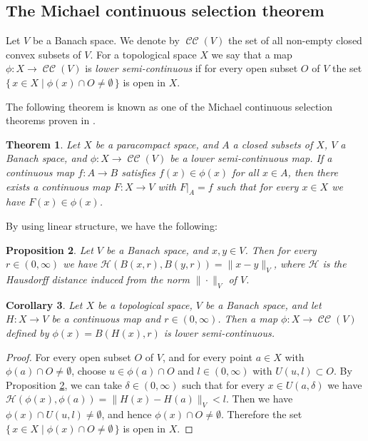 \documentclass[a4paper, 12pt]{amsart}
\theoremstyle{plain}
\newtheorem{thm}{Theorem}[section]
\newtheorem{prop}[thm]{Proposition}
\newtheorem{cor}[thm]{Corollary}
\theoremstyle{definition}
\theoremstyle{remark}
\DeclareMathOperator{\conv}{\mathcal{CC}}
\begin{document}
\subsection{The Michael continuous selection theorem}
Let 
$V$ 
be a Banach space. 
We denote by 
$\conv(V)$ 
the set of all non-empty closed convex subsets  of 
$V$. 
For a topological space 
$X$ 
we say that a map 
$\phi\colon  X\to \conv(V)$ 
is 
\emph{lower semi-continuous} 
if for every open subset 
$O$ 
of 
$V$ 
the set 
$\{\, x\in X\mid \phi(x)\cap O\neq \emptyset\, \}$ 
is open in $X$. 

The following  theorem is known as one of the Michael continuous selection theorems proven in 
\cite{MR77107}. 



\begin{thm}\label{thm:Michael}
Let
 $X$ 
 be a paracompact space, 
and 
$A$ 
 a closed subsets of 
 $X$, 
$V$  a Banach space, 
and 
$\phi\colon X\to \conv(V)$ 
be a lower semi-continuous map. 
If  a continuous map 
$f\colon A\to B$ 
satisfies 
$f(x)\in \phi(x)$ 
for all 
$x\in A$, 
then there exists a continuous map 
$F\colon X\to V$ with 
$F|_A=f$ 
such that 
for every 
$x\in X$ 
we have 
$F(x)\in \phi(x)$. 
\end{thm}



By using  linear structure, 
we have the following:
\begin{prop}\label{prop:Hiso}
Let $V$ be a Banach space,  
and 
$x, y\in V$. 
Then for every 
$r\in (0, \infty)$ 
we have 
$\mathcal{H}(B(x, r), B(y, r))= \|x-y\|_V$, 
where 
$\mathcal{H}$ 
is the Hausdorff distance induced from the norm 
$\|\cdot\|_V$ 
of  
$V$. 
\end{prop} 





\begin{cor}\label{cor:lsc}
Let 
$X$ 
be a topological space,  
$V$ 
be a Banach space, 
and let
$H\colon X\to V$ 
be a continuous map and 
$r\in (0, \infty)$. 
Then a map 
$\phi\colon X\to \conv(V)$ 
defined by 
$\phi(x)=B(H(x), r)$ 
is lower semi-continuous. 
\end{cor}
\begin{proof}
For every open subset 
$O$ 
of 
$V$,  
and for every point 
$a\in X$ 
with 
$\phi(a)\cap O\neq \emptyset$, 
choose  
$u\in \phi(a)\cap O$ 
and  
$l\in (0, \infty)$ 
with 
$U(u, l)\subset O$. 
By Proposition \ref{prop:Hiso}, 
we can take 
$\delta\in (0, \infty)$ 
such that for every 
 $x\in U(a, \delta)$ 
 we have 
 $\mathcal{H}(\phi(x), \phi(a))=\|H(x)-H(a)\|_V<l$. 
Then we have 
$\phi(x)\cap U(u, l)\neq \emptyset$, 
and hence  
$\phi(x)\cap O\neq \emptyset$. 
Therefore the set 
$\{\, x\in X\mid \phi(x)\cap O\neq \emptyset\, \}$ 
is open in $X$. 
\end{proof}
\end{document}
